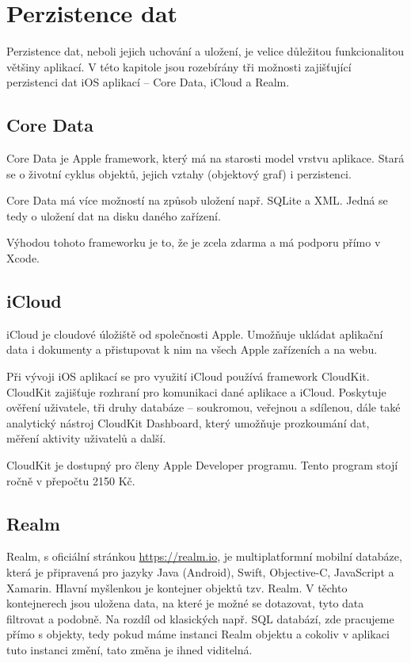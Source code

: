 \documentclass[thesis=M,czech]{FITthesis}[2012/06/26]
\begin{document}
\section{Perzistence dat}
Perzistence dat, neboli jejich uchování a uložení, je velice důležitou funkcionalitou většiny aplikací. V této kapitole jsou rozebírány tři možnosti zajišťující perzistenci dat iOS aplikací -- Core Data, iCloud a Realm.

\subsection{Core Data}
Core Data je Apple framework, který má na starosti model vrstvu aplikace. Stará se o životní cyklus objektů, jejich vztahy (objektový graf) i perzistenci. \cite{coredata}

Core Data má více možností na způsob uložení např. SQLite a XML. Jedná se tedy o uložení dat na disku daného zařízení.  \cite{CoreDataPersistentTypes}

Výhodou tohoto frameworku je to, že je zcela zdarma a má podporu přímo v Xcode. \cite{CoreDataXcode}

\subsection{iCloud}
iCloud je cloudové úložiště od společnosti Apple. Umožňuje ukládat aplikační data i dokumenty a přistupovat k nim na všech Apple zařízeních a na webu. \cite{iCloud}

Při vývoji iOS aplikací se pro využití iCloud používá framework CloudKit. CloudKit zajišťuje rozhraní pro komunikaci dané aplikace a iCloud. \cite{CloudKitDoc} Poskytuje ověření uživatele, tři druhy databáze -- soukromou, veřejnou a sdílenou, dále také analytický nástroj CloudKit Dashboard, který umožňuje prozkoumání dat, měření aktivity uživatelů a další. \cite{CloudKit}

CloudKit je dostupný pro členy Apple Developer programu. \cite{AppleDeveloperProgram} Tento program stojí ročně v přepočtu 2150 Kč. \cite{AppleDeveloperProgramPrice} 

\subsection{Realm}
Realm, s oficiální stránkou \url{https://realm.io}, je multiplatformní mobilní databáze, která je připravená pro jazyky Java (Android), Swift, Objective-C, JavaScript a Xamarin. Hlavní myšlenkou je kontejner objektů tzv. Realm. V těchto kontejnerech jsou uložena data, na které je možné se dotazovat, tyto data filtrovat a podobně. Na rozdíl od klasických např. SQL databází, zde pracujeme přímo s  objekty, tedy pokud máme instanci Realm objektu a cokoliv v aplikaci tuto instanci změní, tato změna je ihned viditelná.
\end{document}
